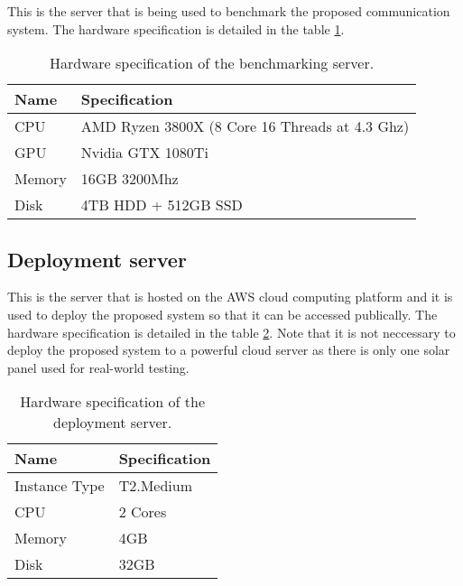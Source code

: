 \documentclass[../thesis.tex]{subfiles}
\begin{document}
This is the server that is being used to benchmark the proposed communication system. The hardware specification is detailed in the table \ref{tab:benchmarkingHardware}.

\begin{table}[h!]
	\begin{center}
		\caption{Hardware specification of the benchmarking server.}
		\label{tab:benchmarkingHardware}
		\begin{tabular}{l|l}
			\toprule
			\textbf{Name} & \textbf{Specification}\\
			\midrule
			CPU & AMD Ryzen 3800X (8 Core 16 Threads at 4.3 Ghz)\\
			GPU & Nvidia GTX 1080Ti\\
			Memory & 16GB 3200Mhz\\
			Disk & 4TB HDD + 512GB SSD\\
			\bottomrule
		\end{tabular}
	\end{center}
\end{table}

\subsection{Deployment server}

This is the server that is hosted on the AWS cloud computing platform and it is used to deploy the proposed system so that it can be accessed publically. The hardware specification is detailed in the table \ref{tab:deploymentHardware}. Note that it is not neccessary to deploy the proposed system to a powerful cloud server as there is only one solar panel used for real-world testing. 

\begin{table}[h!]
	\begin{center}
		\caption{Hardware specification of the deployment server.}
		\label{tab:deploymentHardware}
		\begin{tabular}{l|l}
			\toprule
			\textbf{Name} & \textbf{Specification}\\
			\midrule
			Instance Type & T2.Medium\\
			CPU & 2 Cores\\
			Memory & 4GB\\
			Disk & 32GB\\
			\bottomrule
		\end{tabular}
	\end{center}
\end{table}
\end{document}
